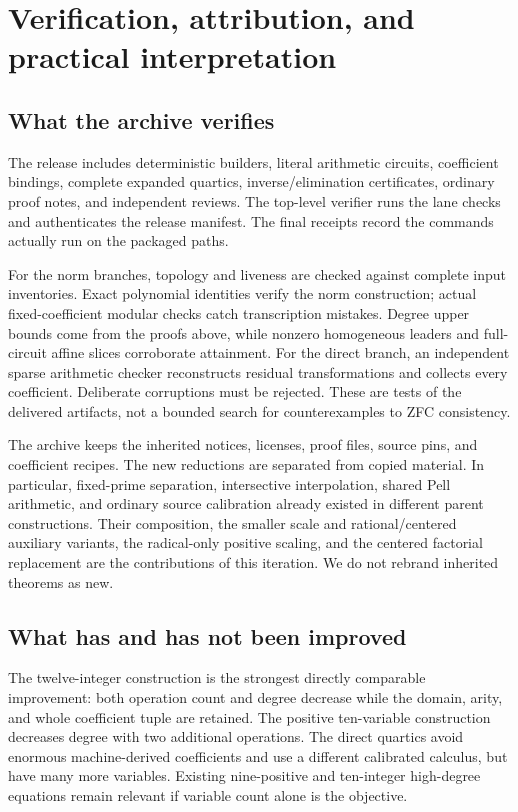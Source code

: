 \documentclass[11pt,letterpaper]{article}
\theoremstyle{definition}\newtheorem{definition}[theorem]{Definition}
\theoremstyle{remark}\newtheorem{remark}[theorem]{Remark}
\begin{document}
\section{Verification, attribution, and practical interpretation}
\subsection{What the archive verifies}
The release includes deterministic builders, literal arithmetic circuits, coefficient bindings, complete expanded quartics, inverse/elimination certificates, ordinary proof notes, and independent reviews. The top-level verifier runs the lane checks and authenticates the release manifest. The final receipts record the commands actually run on the packaged paths.

For the norm branches, topology and liveness are checked against complete input inventories. Exact polynomial identities verify the norm construction; actual fixed-coefficient modular checks catch transcription mistakes. Degree upper bounds come from the proofs above, while nonzero homogeneous leaders and full-circuit affine slices corroborate attainment. For the direct branch, an independent sparse arithmetic checker reconstructs residual transformations and collects every coefficient. Deliberate corruptions must be rejected. These are tests of the delivered artifacts, not a bounded search for counterexamples to ZFC consistency.

The archive keeps the inherited notices, licenses, proof files, source pins, and coefficient recipes. The new reductions are separated from copied material. In particular, fixed-prime separation, intersective interpolation, shared Pell arithmetic, and ordinary source calibration already existed in different parent constructions. Their composition, the smaller scale and rational/centered auxiliary variants, the radical-only positive scaling, and the centered factorial replacement are the contributions of this iteration. We do not rebrand inherited theorems as new.

\subsection{What has and has not been improved}
The twelve-integer construction is the strongest directly comparable improvement: both operation count and degree decrease while the domain, arity, and whole coefficient tuple are retained. The positive ten-variable construction decreases degree with two additional operations. The direct quartics avoid enormous machine-derived coefficients and use a different calibrated calculus, but have many more variables. Existing nine-positive and ten-integer high-degree equations remain relevant if variable count alone is the objective.
\end{document}
